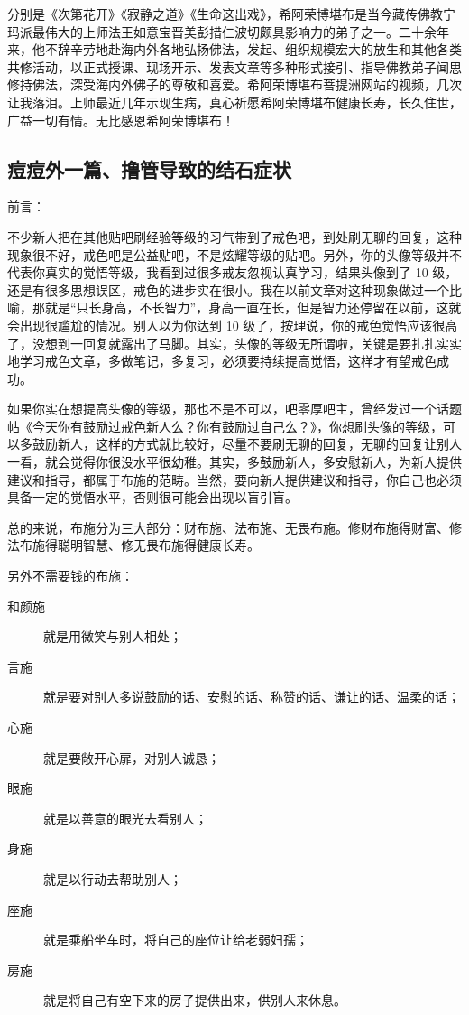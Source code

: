 \begin{book}[希阿荣博堪布三本]
    分别是《次第花开》《寂静之道》《生命这出戏》，希阿荣博堪布是当今藏传佛教宁玛派最伟大的上师法王如意宝晋美彭措仁波切颇具影响力的弟子之一。二十余年来，他不辞辛劳地赴海内外各地弘扬佛法，发起、组织规模宏大的放生和其他各类共修活动，以正式授课、现场开示、发表文章等多种形式接引、指导佛教弟子闻思修持佛法，深受海内外佛子的尊敬和喜爱。希阿荣博堪布菩提洲网站的视频，几次让我落泪。上师最近几年示现生病，真心祈愿希阿荣博堪布健康长寿，长久住世，广益一切有情。无比感恩希阿荣博堪布！
\end{book}

\subsection{痘痘外一篇、撸管导致的结石症状}

前言：

不少新人把在其他贴吧刷经验等级的习气带到了戒色吧，到处刷无聊的回复，这种现象很不好，戒色吧是公益贴吧，不是炫耀等级的贴吧。另外，你的头像等级并不代表你真实的觉悟等级，我看到过很多戒友忽视认真学习，结果头像到了 10 级，还是有很多思想误区，戒色的进步实在很小。我在以前文章对这种现象做过一个比喻，那就是“只长身高，不长智力”，身高一直在长，但是智力还停留在以前，这就会出现很尴尬的情况。别人以为你达到 10 级了，按理说，你的戒色觉悟应该很高了，没想到一回复就露出了马脚。其实，头像的等级无所谓啦，关键是要扎扎实实地学习戒色文章，多做笔记，多复习，必须要持续提高觉悟，这样才有望戒色成功。

如果你实在想提高头像的等级，那也不是不可以，吧零厚吧主，曾经发过一个话题帖《今天你有鼓励过戒色新人么？你有鼓励过自己么？》，你想刷头像的等级，可以多鼓励新人，这样的方式就比较好，尽量不要刷无聊的回复，无聊的回复让别人一看，就会觉得你很没水平很幼稚。其实，多鼓励新人，多安慰新人，为新人提供建议和指导，都属于布施的范畴。当然，要向新人提供建议和指导，你自己也必须具备一定的觉悟水平，否则很可能会出现以盲引盲。

总的来说，布施分为三大部分：财布施、法布施、无畏布施。修财布施得财富、修法布施得聪明智慧、修无畏布施得健康长寿。

另外不需要钱的布施：

\begin{description}
    \item[和颜施] 就是用微笑与别人相处；
    \item[言施] 就是要对别人多说鼓励的话、安慰的话、称赞的话、谦让的话、温柔的话；
    \item[心施] 就是要敞开心扉，对别人诚恳；
    \item[眼施] 就是以善意的眼光去看别人；
    \item[身施] 就是以行动去帮助别人；
    \item[座施] 就是乘船坐车时，将自己的座位让给老弱妇孺；
    \item[房施] 就是将自己有空下来的房子提供出来，供别人来休息。
\end{description}

